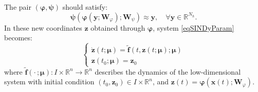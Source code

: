 \documentclass[reqno]{amsart}[standalone]
\theoremstyle{definition}
\theoremstyle{remark}
\newcommand{\R}{\mathbb{R}}
\newcommand{\bs}{\boldsymbol}
\begin{document}
The pair $(\bs{\varphi}, \bs{\psi})$ should satisfy:
\begin{equation}\label{eqAUTOENC}
\bs{\psi}\left(\bs{\varphi}(\bs{y}; \bs{W}_\varphi); \bs{W}_\psi\right)\approx \bs{y}, \quad\forall\bs{y}\in\R^{N_h}.
\end{equation}
In these new coordinates $\bs{z}$ obtained through $\bs{\varphi}$, system \eqref{eqSINDyParam} becomes:
\begin{equation}\label{eqSINDyLATENT}
    \begin{cases}
   \dot{\bs{z}}(t; \bs{\mu}) = \bs{\tilde{f}}(t, \bs{z}(t; \bs{\mu}); \bs{\mu})\\
   \bs{z}(t_0; \bs{\mu}) = \bs{z}_{0}
    \end{cases}
\end{equation}
where $\bs{\tilde{f}}(\cdot\,;\bs{\mu}):I\times\R^n\to\R^n$ describes the dynamics of the low-dimensional system with initial condition $(t_0, \bs{z}_0)\in I\times\R^n$, and $\bs{z}(t) = \bs{\varphi}(\bs{x}(t); \bs{W}_\varphi)$.
%
\end{document}
